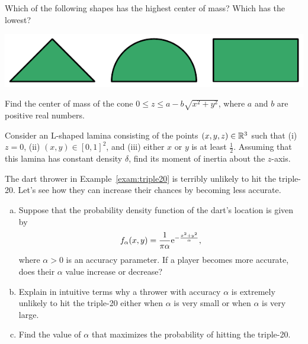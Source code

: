 \documentclass[prettycode,shellescape]{watsonbook}
\begin{document}
\begin{aexercise} 
  Which of the following shapes has the highest center of mass? Which
  has the lowest? 
  \begin{center}
    \includegraphics{exercisefigures/centerofmassshapes} 
  \end{center}
\end{aexercise}

\begin{aexercise}
  Find the center of mass of the cone $0 \leq z \leq a - b\sqrt{x^2 +
    y^2}$, where $a$ and $b$ are positive real numbers. 
\end{aexercise}

\begin{aexercise} 
  Consider an L-shaped lamina consisting of the points
  $(x,y,z) \in \mathbb{R}^3$ such that (i) $z = 0$, (ii) $(x,y) \in [0,1]^2$, and
  (iii) either $x$ or $y$ is at least $\frac{1}{2}$. Assuming that
  this lamina has constant density $\delta$, find its moment of
  inertia about the $z$-axis. 
\end{aexercise}

\begin{aexercise}
  The dart thrower in Example~\ref{exam:triple20} is terribly unlikely
  to hit the triple-20. Let's see how they can increase their chances
  by becoming less accurate.

  \begin{enumerate}[(a),topsep=6pt,leftmargin=12pt,itemsep=6pt]
  \item \label{part:whichway} Suppose that the probability density
  function of the dart's location is given by
  \[
    f_\alpha(x,y) = \frac{1}{\pi\alpha} \mathrm{e}^{-\frac{x^2+y^2}{\alpha}},
  \]
  where $\alpha >0$ is an accuracy parameter. If a player becomes more
  accurate, does their $\alpha$ value increase or decrease? 

  \item \label{part:unlikely} Explain in intuitive terms why a
  thrower with accuracy $\alpha$ is extremely unlikely to hit the
  triple-20 either when $\alpha$ is very small or when $\alpha$ is
  very large.

  \item  \label{part:maximizer} Find the value of $\alpha$ that
    maximizes the probability of hitting the triple-20.
  \end{enumerate}
\end{aexercise}
\end{document}
